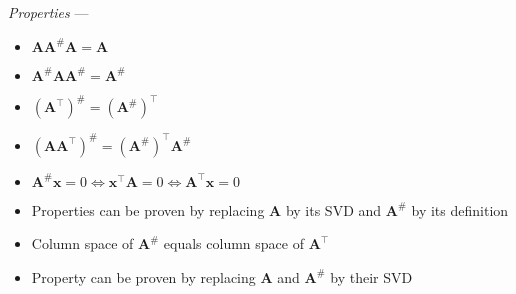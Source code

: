 \emph{Properties} --- 
\begin{multicols}{2}
\begin{itemize}
    \item $\boldsymbol{A}\boldsymbol{A}^{\#}\boldsymbol{A} = \boldsymbol{A}$
    \item $\boldsymbol{A}^{\#}\boldsymbol{A}\boldsymbol{A}^{\#} = \boldsymbol{A}^{\#}$
    \item $(\boldsymbol{A}^\intercal)^{\#} = (\boldsymbol{A}^{\#})^\intercal$
    \item $(\boldsymbol{A}\boldsymbol{A}^\intercal)^{\#} = (\boldsymbol{A}^{\#})^\intercal\boldsymbol{A}^{\#}$
    \item $\boldsymbol{A}^{\#} \boldsymbol{x} = 0 \Leftrightarrow \boldsymbol{x}^\intercal \boldsymbol{A} = 0 \Leftrightarrow \boldsymbol{A}^\intercal \boldsymbol{x} = 0$
    \item Properties can be proven by replacing $\boldsymbol{A}$ by its SVD and $\boldsymbol{A}^{\#}$ by its definition
    \item Column space of $\boldsymbol{A}^{\#}$ equals column space of $\boldsymbol{A}^\intercal$
    \item Property can be proven by replacing $\boldsymbol{A}$ and $\boldsymbol{A}^{\#}$ by their SVD 
\end{itemize}
\end{multicols}